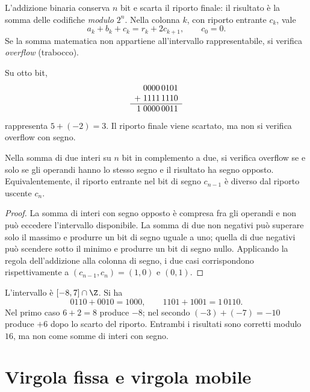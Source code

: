 L'addizione binaria conserva \(n\) bit e scarta il riporto finale:
il risultato è la somma delle codifiche \emph{modulo} \(2^n\).
Nella colonna \(k\), con riporto entrante \(c_k\), vale
\[
  a_k+b_k+c_k=r_k+2c_{k+1},\qquad c_0=0.
\]
Se la somma matematica non appartiene all'intervallo rappresentabile,
si verifica \emph{overflow} (trabocco).

\begin{example}
Su otto bit,
\[
  \begin{array}{r@{\;}r}
      &0000\,0101\\
    + &1111\,1110\\ \hline
    1 &0000\,0011
  \end{array}
\]
rappresenta \(5+(-2)=3\). Il riporto finale viene scartato, ma
non si verifica overflow con segno.
\end{example}

\begin{proposition}
\label{prop:fi-overflow-somma}
Nella somma di due interi su \(n\) bit in complemento a due,
si verifica overflow se e solo se gli operandi hanno lo stesso segno
e il risultato ha segno opposto. Equivalentemente, il riporto
entrante nel bit di segno \(c_{n-1}\) è diverso dal riporto uscente
\(c_n\).
\end{proposition}

\begin{proof}
La somma di interi con segno opposto è compresa fra gli operandi e non
può eccedere l'intervallo disponibile. La somma di due non negativi
può superare solo il massimo e produrre un bit di segno uguale a uno;
quella di due negativi può scendere sotto il minimo e produrre un
bit di segno nullo. Applicando la regola dell'addizione alla colonna di
segno, i due casi corrispondono rispettivamente a
\((c_{n-1},c_n)=(1,0)\) e \((0,1)\).
\end{proof}

\begin{example}
L'intervallo è \([-8,7]\cap\Z\). Si ha
\[
  0110+0010=1000,\qquad 1101+1001=1\,0110.
\]
Nel primo caso \(6+2=8\) produce \(-8\); nel secondo
\((-3)+(-7)=-10\) produce \(+6\) dopo lo scarto del riporto.
Entrambi i risultati sono corretti modulo \(16\), ma non come
somme di interi con segno.
\end{example}

\section{Virgola fissa e virgola mobile}
\label{sec:fi-virgola-mobile}

